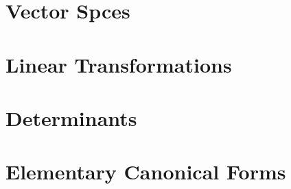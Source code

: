 

\section{Vector Spces}
\section{Linear Transformations}
\section{Determinants}
\section{Elementary Canonical Forms}
